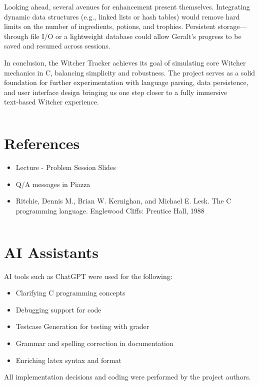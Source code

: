 \documentclass[12pt,a4paper]{article}
\begin{document}
Looking ahead, several avenues for enhancement present themselves. Integrating dynamic data structures (e.g., linked lists or hash tables) would remove hard limits on the number of ingredients, potions, and trophies. Persistent storage—through file I/O or a lightweight database could allow Geralt’s progress to be saved and resumed across sessions. 

In conclusion, the Witcher Tracker achieves its goal of simulating core Witcher mechanics in C, balancing simplicity and robustness. The project serves as a solid foundation for further experimentation with language parsing, data persistence, and user interface design bringing us one step closer to a fully immersive text‑based Witcher experience.

\begin{verbatim}

\end{verbatim}

\section*{References}
\begin{itemize}
  \item Lecture - Problem Session Slides
  \item Q/A messages in Piazza
  \item Ritchie, Dennis M., Brian W. Kernighan, and Michael E. Lesk. The C programming language. Englewood Cliffs: Prentice Hall, 1988
\end{itemize}

\begin{verbatim}

\end{verbatim}

\section*{AI Assistants}
AI tools such as ChatGPT were used for the following:
\begin{itemize}
  \item Clarifying C programming concepts
  \item Debugging support for code
  \item Testcase Generation for testing with grader
  \item Grammar and spelling correction in documentation
  \item Enriching latex syntax and format
\end{itemize}
All implementation decisions and coding were performed by the project authors.
\end{document}
